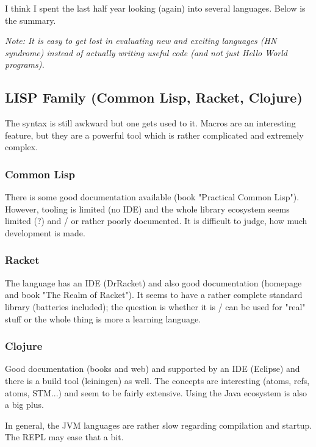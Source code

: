 
I think I spent the last half year looking (again) into several languages. Below is the summary.

\emph{Note: It is easy to get lost in evaluating new and exciting languages (HN syndrome) instead of actually writing useful code (and not just Hello World programs).}

\subsection{LISP Family (Common Lisp, Racket, Clojure)}

The syntax is still awkward but one gets used to it. Macros are an interesting feature, but they are a powerful tool which is rather complicated and extremely complex.

\subsubsection{Common Lisp}

There is some good documentation available (book "Practical Common Lisp"). However, tooling is limited (no IDE) and the whole library ecosystem seems limited (?) and / or rather poorly documented. It is difficult to judge, how much development is made.

\subsubsection{Racket}

The language has an IDE (DrRacket) and also good documentation (homepage and book "The Realm of Racket"). It seems to have a rather complete standard library (batteries included); the question is whether it is / can be used for "real" stuff or the whole thing is more a learning language.

\subsubsection{Clojure}

Good documentation (books and web) and supported by an IDE (Eclipse) and there is a build tool (leiningen) as well. The concepts are interesting (atoms, refs, atoms, STM...) and seem to be fairly extensive. Using the Java ecosystem is also a big plus.

In general, the JVM languages are rather slow regarding compilation and startup. The REPL may ease that a bit.

